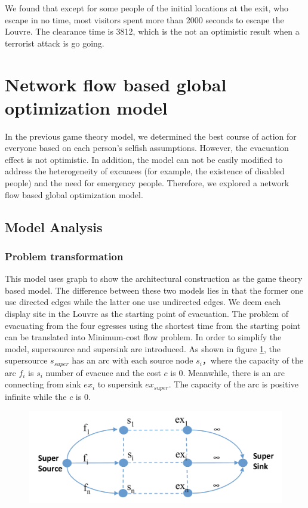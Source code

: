 \documentclass{mcmthesis}
\begin{document}
We found that except for some people of the initial locations at the exit, who escape in no time,  most visitors spent more than 2000 seconds to escape the Louvre. The clearance time is 3812, which is the not an optimistic result when a terrorist attack is go going.


\section{Network flow based global optimization model}


In the previous game theory model, we determined the best course of action for everyone based on each person's selfish assumptions. However, the evacuation effect is not optimistic. In addition, the model can not be easily modified to address the heterogeneity of excuaees (for example, the existence of disabled people) and the need for emergency people. Therefore, we explored a network flow based global optimization model.

\subsection{Model Analysis}

\subsubsection{Problem transformation}

This model uses graph to show the architectural construction as the game theory based model. The difference between these two models lies in that the former one use directed edges while the latter one use undirected edges. We deem each display site in the Louvre as the starting point of evacuation. The problem of evacuating from the four egresses using the shortest time from the starting point can be translated into Minimum-cost flow problem. In order to simplify the model, supersource and supersink are introduced. As shown in figure \ref{fig:screenshot004}, the  supersource $s_{super}$ has an arc with each source node $s_i$，where the capacity of the arc $f_i$ is $s_i$  number of evacuee and the cost $c$ is 0. Meanwhile, there is an arc connecting from sink $ex_i$ to supersink $ex_{super}$. The capacity of the arc is positive infinite while the $c$ is 0.

\begin{figure}
	\centering
	\includegraphics[width=0.7\linewidth]{../../Figure/screenshot004}
	\caption{}
	\label{fig:screenshot004}
\end{figure}
\end{document}
